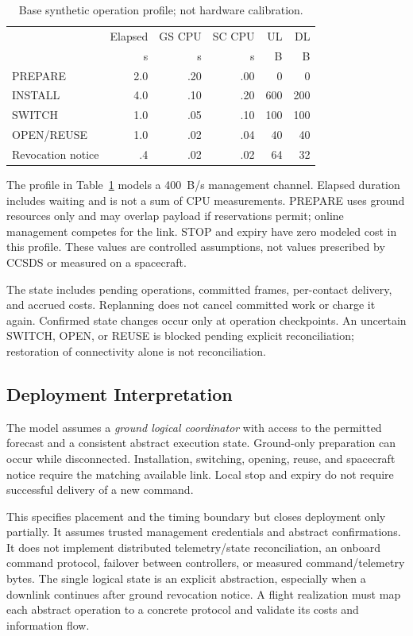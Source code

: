 \documentclass[conference]{IEEEtran}
\begin{document}
\begin{table}[t]
\centering\small
\caption{Base synthetic operation profile; not hardware calibration.}
\label{tab:costs}
\setlength{\tabcolsep}{4pt}
\begin{tabular}{lrrrrr}
\toprule
 & Elapsed & GS CPU & SC CPU & UL & DL \\
 & s & s & s & B & B \\
\midrule
PREPARE & 2.0 & .20 & .00 & 0 & 0 \\
INSTALL & 4.0 & .10 & .20 & 600 & 200 \\
SWITCH & 1.0 & .05 & .10 & 100 & 100 \\
OPEN/REUSE & 1.0 & .02 & .04 & 40 & 40 \\
Revocation notice & .4 & .02 & .02 & 64 & 32 \\
\bottomrule
\end{tabular}
\end{table}

The profile in Table~\ref{tab:costs} models a 400~B/s management channel. Elapsed duration includes waiting and is not a sum of CPU measurements. PREPARE uses ground resources only and may overlap payload if reservations permit; online management competes for the link. STOP and expiry have zero modeled cost in this profile. These values are controlled assumptions, not values prescribed by CCSDS or measured on a spacecraft.

The state includes pending operations, committed frames, per-contact delivery, and accrued costs. Replanning does not cancel committed work or charge it again. Confirmed state changes occur only at operation checkpoints. An uncertain SWITCH, OPEN, or REUSE is blocked pending explicit reconciliation; restoration of connectivity alone is not reconciliation.

\subsection{Deployment Interpretation}
The model assumes a \emph{ground logical coordinator} with access to the permitted forecast and a consistent abstract execution state. Ground-only preparation can occur while disconnected. Installation, switching, opening, reuse, and spacecraft notice require the matching available link. Local stop and expiry do not require successful delivery of a new command.

This specifies placement and the timing boundary but closes deployment only partially. It assumes trusted management credentials and abstract confirmations. It does not implement distributed telemetry/state reconciliation, an onboard command protocol, failover between controllers, or measured command/telemetry bytes. The single logical state is an explicit abstraction, especially when a downlink continues after ground revocation notice. A flight realization must map each abstract operation to a concrete protocol and validate its costs and information flow.
\end{document}
